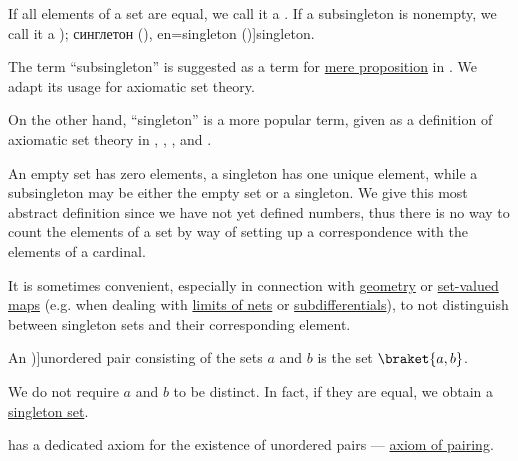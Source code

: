 \begin{definition}\label{def:subsingleton_set}
  If all elements of a set are equal, we call it a . If a subsingleton is nonempty, we call it a \term[ru=синглет (\cite[131]{КановейЛюбецкий2010СовременнаяТеорияМножеств}); синглетон (\cite[129]{КолмогоровДрагалин2006Логика}), en=singleton (\cite[10]{Halmos1960NaiveSetTheory})]{singleton}.
\end{definition}
\begin{comments}
  \item The term \enquote{subsingleton} is suggested as a term for \hyperref[def:mere_proposition]{mere proposition} in \cite[112]{UnivalentFoundationsProgram2024OctoberHoTT}. We adapt its usage for axiomatic set theory.

  On the other hand, \enquote{singleton} is a more popular term, given as a definition of axiomatic set theory in
  \cite[10]{Halmos1960NaiveSetTheory},
  \cite[7]{Jech2006SetTheory},
  \cite[235]{Mendelson2015Logic}
  \cite[3]{Kelley1975GeneralTopology},
  \cite[131]{КановейЛюбецкий2010СовременнаяТеорияМножеств} and
  \cite[129]{КолмогоровДрагалин2006Логика}.

  \item An empty set has zero elements, a singleton has one unique element, while a subsingleton may be either the empty set or a singleton. We give this most abstract definition since we have not yet defined numbers, thus there is no way to count the elements of a set by way of setting up a correspondence with the elements of a cardinal.

  \item It is sometimes convenient, especially in connection with \hyperref[ch:geometry]{geometry} or \hyperref[def:function]{set-valued maps} (e.g. when dealing with \hyperref[def:net_limit_point]{limits of nets} or \hyperref[def:subdifferentials]{subdifferentials}), to not distinguish between singleton sets and their corresponding element.
\end{comments}

\begin{definition}\label{def:unordered_pair}
  An \term[ru=неупорядоченная пара (\cite[127]{Герасимов2011Вычислимость})]{unordered pair} consisting of the sets \( a \) and \( b \) is the set \( \braket{ a, b } \).

  We do not require \( a \) and \( b \) to be distinct. In fact, if they are equal, we obtain a \hyperref[def:subsingleton_set]{singleton set}.
\end{definition}
\begin{comments}
  \item \hyperref[def:zfc]{} has a dedicated axiom for the existence of unordered pairs --- \hyperref[def:zfc/pairing]{axiom of pairing}.
\end{comments}

